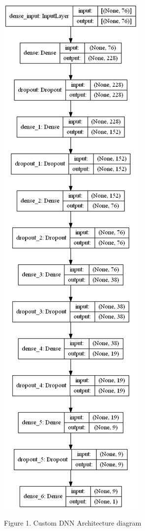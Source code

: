 \documentclass[conference]{IEEEtran}
\begin{document}
\smallbreak
\smallbreak
\smallbreak
\includegraphics[scale = 0.35]{images/model_plot.png}
\smallbreak
\caption {Figure 1. Custom DNN Architecture diagram}
\smallbreak
\smallbreak
\smallbreak
\end{document}
